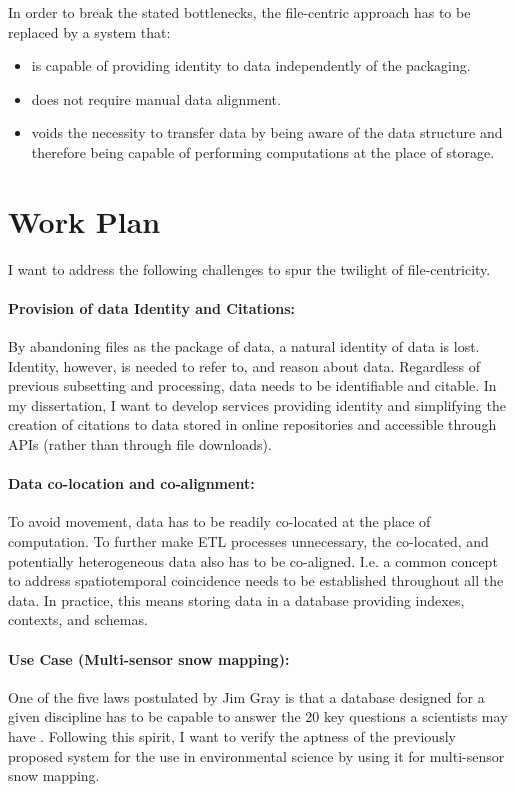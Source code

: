 \documentclass[a4paper,10pt]{article}
\begin{document}
\vspace{1cm}

In order to break the stated bottlenecks, the file-centric approach has to be replaced by a system that:
\begin{itemize}
    \item is capable of providing identity to data independently of the packaging.
    \item does not require manual data alignment.
    \item voids the necessity to transfer data by being aware of the data structure and therefore being capable of performing computations at the place of storage.
\end{itemize}


\newpage

\section{Work Plan}
I want to address the following challenges to spur the twilight of file-centricity.

\paragraph{Provision of data Identity and Citations:}
By abandoning files as the package of data, a natural identity of data is lost. Identity, however, is needed to refer to, and reason about data. Regardless of previous subsetting and processing, data needs to be identifiable and citable. In my dissertation, I want to develop services providing identity and simplifying the creation of citations to data stored in online repositories and accessible through \glspl{API} (rather than through file downloads).

\paragraph{Data co-location and co-alignment:}
To avoid movement, data has to be readily co-located at the place of computation. To further make \gls{ETL} processes unnecessary, the co-located, and potentially heterogeneous data also has to be co-aligned. I.e. a common concept to address spatiotemporal coincidence needs to be established throughout all the data. In practice, this means storing data in a database providing indexes, contexts, and schemas.

\paragraph{Use Case (Multi-sensor snow mapping):}
One of the five laws postulated by Jim Gray is that a database designed for a given discipline has to be capable to answer the 20 key questions a scientists may have \citep{Hey2009, Szalay2009}.
Following this spirit, I want to verify the aptness of the previously proposed system for the use in environmental science by using it for multi-sensor snow mapping. 
\end{document}
